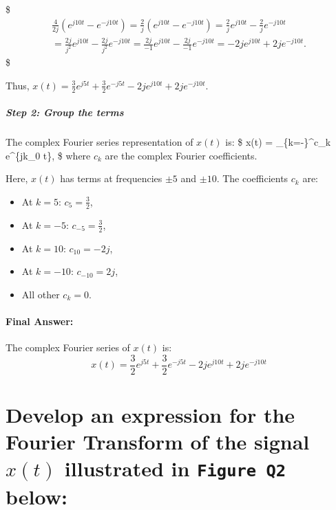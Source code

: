 \documentclass[11pt]{article}
\providecommand{\tightlist}{%
      \setlength{\itemsep}{0pt}\setlength{\parskip}{0pt}}
\begin{document}
\$ \begin{align*}
\frac{4}{2j}(e^{j10t} - e^{-j10t}) =  \frac{2}{j}(e^{j10t} - e^{-j10t}) = \frac{2}{j}e^{j10t} - \frac{2}{j}e^{-j10t} \\
= \frac{2j}{j^2}e^{j10t} - \frac{2j}{j^2}e^{-j10t} = \frac{2j}{-1}e^{j10t} - \frac{2j}{-1}e^{-j10t} = -2je^{j10t} + 2je^{-j10t}.
\end{align*} \$

Thus,
\(x(t) = \frac{3}{2}e^{j5t} + \frac{3}{2}e^{-j5t} - 2je^{j10t} + 2je^{-j10t}.\)

\subparagraph{Step 2: Group the terms}\label{step-2-group-the-terms}

The complex Fourier series representation of \(x(t)\) is: \$ x(t) =
\sum\limits\_\{k=-\infty\}\^{}\infty c\_k e\^{}\{jk\omega\_0 t\}, \$
where \(c_k\) are the complex Fourier coefficients.

Here, \(x(t)\) has terms at frequencies \(\pm 5\) and \(\pm 10\). The
coefficients \(c_k\) are:

\begin{itemize}
\tightlist
\item
  At \(k = 5\): \(c_5 = \frac{3}{2}\),
\item
  At \(k = -5\): \(c_{-5} = \frac{3}{2}\),
\item
  At \(k = 10\): \(c_{10} = -2j\),
\item
  At \(k = -10\): \(c_{-10} = 2j\),
\item
  All other \(c_k = 0\).
\end{itemize}

\paragraph{Final Answer:}\label{final-answer}

The complex Fourier series of \(x(t)\) is: \[\boxed{
x(t) = \frac{3}{2}e^{j5t} + \frac{3}{2}e^{-j5t} - 2je^{j10t} + 2je^{-j10t}
}\]

    

    \section{\texorpdfstring{Develop an expression for the Fourier Transform
of the signal \(x(t)\) illustrated in \texttt{Figure\ Q2}
below:}{Develop an expression for the Fourier Transform of the signal x(t) illustrated in Figure Q2 below:}}\label{develop-an-expression-for-the-fourier-transform-of-the-signal-xt-illustrated-in-figure-q2-below}
\end{document}
